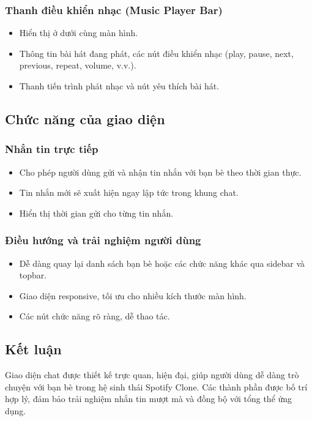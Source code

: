 \documentclass{book}
\begin{document}
\subsubsection{Thanh điều khiển nhạc (Music Player Bar)}
\begin{itemize}
    \item Hiển thị ở dưới cùng màn hình.
    \item Thông tin bài hát đang phát, các nút điều khiển nhạc (play, pause, next, previous, repeat, volume, v.v.).
    \item Thanh tiến trình phát nhạc và nút yêu thích bài hát.
\end{itemize}

\subsection{Chức năng của giao diện}

\subsubsection{Nhắn tin trực tiếp}
\begin{itemize}
    \item Cho phép người dùng gửi và nhận tin nhắn với bạn bè theo thời gian thực.
    \item Tin nhắn mới sẽ xuất hiện ngay lập tức trong khung chat.
    \item Hiển thị thời gian gửi cho từng tin nhắn.
\end{itemize}

\subsubsection{Điều hướng và trải nghiệm người dùng}
\begin{itemize}
    \item Dễ dàng quay lại danh sách bạn bè hoặc các chức năng khác qua sidebar và topbar.
    \item Giao diện responsive, tối ưu cho nhiều kích thước màn hình.
    \item Các nút chức năng rõ ràng, dễ thao tác.
\end{itemize}

\subsection{Kết luận}
Giao diện chat được thiết kế trực quan, hiện đại, giúp người dùng dễ dàng trò chuyện với bạn bè trong hệ sinh thái Spotify Clone. Các thành phần được bố trí hợp lý, đảm bảo trải nghiệm nhắn tin mượt mà và đồng bộ với tổng thể ứng dụng.
\end{document}
